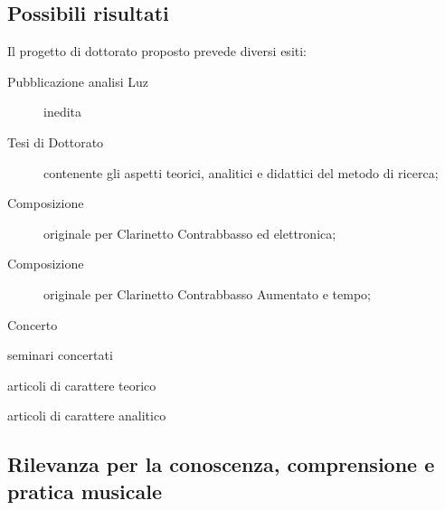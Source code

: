 \documentclass{gs-adonis}
\begin{document}

\subsection{Possibili risultati}%


Il progetto di dottorato proposto prevede diversi esiti:

\begin{description}
  \item[Pubblicazione analisi Luz] inedita
  \item[Tesi di Dottorato] contenente gli aspetti teorici, analitici e didattici del metodo di ricerca;
  \item[Composizione] originale per Clarinetto Contrabbasso ed elettronica;
  \item[Composizione] originale per Clarinetto Contrabbasso Aumentato e tempo;
  \item[Concerto]
\end{description}


seminari concertati

articoli di carattere teorico

articoli di carattere analitico

\subsection{Rilevanza per la conoscenza, comprensione e pratica musicale}


\end{document}
